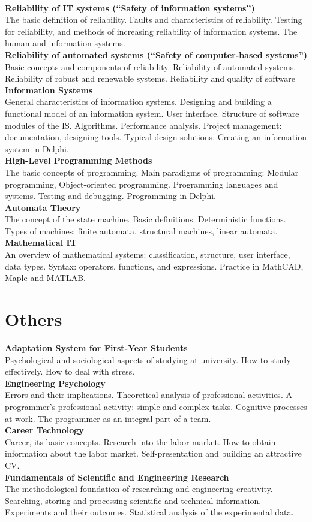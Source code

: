 \documentclass[a4paper, 12pt]{article}
\newcommand{\group}[1] {\section{#1}}
\newcommand{\discipline}[1] {\textbf{#1} \\ }
\newcommand{\desc}[1] { #1 \\ }
\begin{document}
\

\discipline{Reliability of IT systems (``Safety of information systems'')}
\desc{The basic definition of reliability. Faults and characteristics of reliability. Testing for reliability, and methods of increasing reliability of information systems. The human and information systems.}

\discipline{Reliability of automated systems (``Safety of computer-based systems'')}
\desc{Basic concepts and components of reliability. Reliability of automated systems. Reliability of robust  and renewable systems. Reliability and quality of software}

\discipline{Information Systems}
\desc{General characteristics of information systems. Designing and building a functional model of an information system. User interface. Structure of software modules of the IS. Algorithms. Performance analysis. Project management: documentation, designing tools. Typical design solutions. Creating an information system in Delphi.}

\discipline{High-Level Programming Methods}
\desc{The basic concepts of programming. Main paradigms of programming: Modular programming, Object-oriented programming. Programming languages and systems. Testing and debugging. Programming in Delphi.}

\discipline{Automata Theory}
\desc{The concept of the state machine. Basic definitions. Deterministic functions. Types of machines: finite automata, structural machines, linear automata.}

\discipline{Mathematical IT}
\desc{An overview of mathematical systems: classification, structure, user interface, data types. Syntax: operators, functions, and expressions. Practice in MathCAD, Maple and MATLAB.}


\group{Others}

\discipline{Adaptation System for First-Year Students}
\desc{Psychological and sociological aspects of studying at university. How to study effectively. How to deal with stress.}

\discipline{Engineering Psychology}
\desc{Errors and their implications. Theoretical analysis of professional activities. A programmer's professional activity: simple and complex tasks. Cognitive processes at work. The programmer as an integral part of a team.}

\discipline{Career Technology}
\desc{Career, its basic concepts. Research into the labor market. How to obtain information about the labor market. Self-presentation and building an attractive CV.}

\discipline{Fundamentals of Scientific and Engineering Research}
\desc{The methodological foundation of researching and engineering creativity. Searching, storing and processing scientific and technical information. Experiments and their outcomes. Statistical analysis of the experimental data.}
\end{document}
